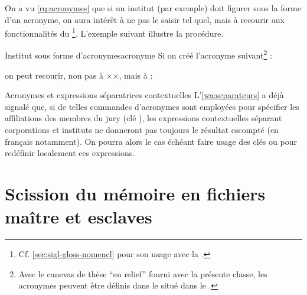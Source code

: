 On a vu \vref{rq:acronymes} que si un institut (par exemple) doit figurer
sous la forme d'un acronyme, on aura intérêt à ne pas le saisir tel
quel, mais à recourir aux fonctionnalités du
\footnote{Cf. \vref{sec:sigl-gloss-nomencl} pour
  son usage avec la \yatcl.}. L'exemple suivant illustre la
procédure.
%
\begin{dbexample}{Institut sous forme d'acronymes}{acronyme}
  Si on créé l'acronyme suivant\footnote{Avec le canevas de thèse \enquote{en
      relief} fourni avec la présente classe, les acronymes peuvent être
    définis dans le \File{\acronymsfile} situé dans le
    \Directory{\auxiliarydirectory}.} :
\begin{preamblecode}
\end{preamblecode}
on peut recourir, non pas à ××, mais à :
\begin{preamblecode}
\end{preamblecode}
\end{dbexample}

\begin{dbremark}{Acronymes et expressions séparatrices contextuelles}{}
  L'\vref{wa:separateurs} a déjà signalé que, si de telles commandes
  d'acronymes sont employées pour spécifier les affiliations des membres du
  jury (clé ), les expressions contextuelles séparant
  corporations et instituts ne donneront pas toujours le résultat escompté (en
  français notamment). On pourra alors le cas échéant faire usage des clés
   ou  pour redéfinir
  localement ces expressions.
\end{dbremark}

\section{Scission du mémoire en fichiers maître et esclaves}
\label{sec:repart-du-memo}

